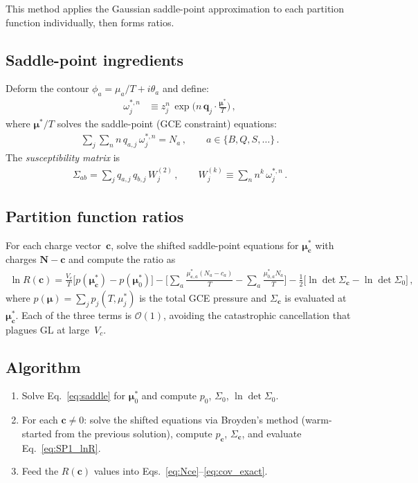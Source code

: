 \documentclass[11pt]{article}
\newcommand{\bmu}{\bm{\mu}}
\newcommand{\bq}{\mathbf{q}}
\newcommand{\bc}{\mathbf{c}}
\newcommand{\bN}{\mathbf{N}}
\begin{document}
This method applies the Gaussian saddle-point approximation to each partition function individually, then forms ratios.

\subsection{Saddle-point ingredients}

Deform the contour $\phi_a = \mu_a/T + i\theta_a$ and define:
\begin{align}
  \omega_j^{*,n} &\equiv z_j^n\,\exp\!\Big(n\,\bq_j\cdot\frac{\bmu^*}{T}\Big) \,,
  \label{eq:omega}
\end{align}
where $\bmu^*/T$ solves the saddle-point (GCE constraint) equations:
\begin{align}
  \sum_j \sum_n n\,q_{a,j}\,\omega_j^{*,n} = N_a \,,
  \qquad a \in \{B,Q,S,\ldots\} \,.
  \label{eq:saddle}
\end{align}
The \emph{susceptibility matrix} is
\begin{align}
  \Sigma_{ab} = \sum_j q_{a,j}\,q_{b,j}\,W_j^{(2)} \,,
  \qquad
  W_j^{(k)} \equiv \sum_{n} n^k\,\omega_j^{*,n} \,.
  \label{eq:Sigma}
\end{align}

\subsection{Partition function ratios}

For each charge vector~$\bc$, solve the shifted saddle-point equations for $\bmu_\bc^*$ with charges $\bN - \bc$ and compute the ratio as
\begin{align}
  \ln R(\bc)
  = \frac{V_c}{T}\big[p(\bmu_\bc^*) - p(\bmu_0^*)\big]
  - \bigg[\sum_a \frac{\mu_{\bc,a}^*(N_a-c_a)}{T} - \sum_a \frac{\mu_{0,a}^* N_a}{T}\bigg]
  - \frac{1}{2}\big[\ln\det\Sigma_\bc - \ln\det\Sigma_0\big] \,,
  \label{eq:SP1_lnR}
\end{align}
where $p(\bmu) = \sum_j p_j(T,\mu_j^*)$ is the total GCE pressure and $\Sigma_\bc$ is evaluated at $\bmu_\bc^*$.
Each of the three terms is $\mathcal{O}(1)$, avoiding the catastrophic cancellation that plagues GL at large~$V_c$.

\subsection{Algorithm}

\begin{enumerate}
  \item Solve Eq.~\eqref{eq:saddle} for $\bmu^*_0$ and compute $p_0$, $\Sigma_0$, $\ln\det\Sigma_0$.
  \item For each $\bc \neq 0$: solve the shifted equations via Broyden's method (warm-started from the previous solution), compute $p_\bc$, $\Sigma_\bc$, and evaluate Eq.~\eqref{eq:SP1_lnR}.
  \item Feed the $R(\bc)$ values into Eqs.~\eqref{eq:Nce}--\eqref{eq:cov_exact}.
\end{enumerate}
\end{document}
